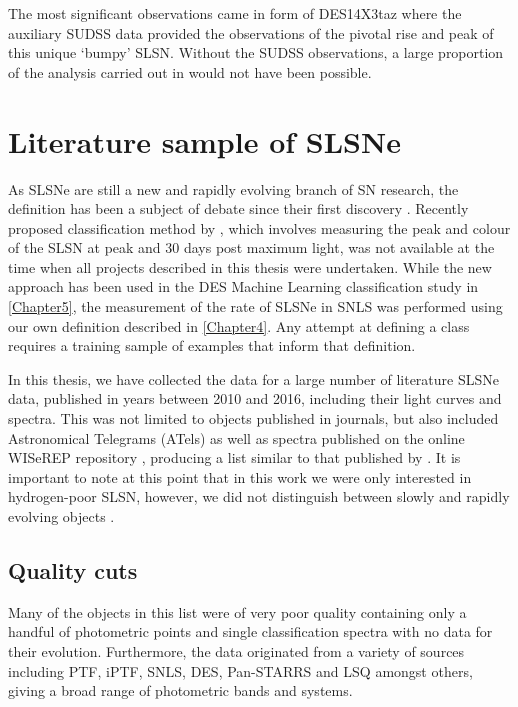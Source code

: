 The most significant observations came in form of DES14X3taz where the auxiliary SUDSS data provided the observations of the pivotal rise and peak of this unique `bumpy' SLSN. Without the SUDSS observations, a large proportion of the analysis carried out in \citep{Smith2016} would not have been possible.

\section{Literature sample of SLSNe} \label{sec:litSample}
As SLSNe are still a new and rapidly evolving branch of SN research, the definition has been a subject of debate since their first discovery \citep{Gal-Yam2012, Inserra2013, Nicholl2014}. Recently proposed classification method by \citet{Inserra2018}, which involves measuring the peak and colour of the SLSN at peak and 30 days post maximum light, was not available at the time when all projects described in this thesis were undertaken. While the new approach has been used in the DES Machine Learning classification study in \cref{Chapter5}, the measurement of the rate of SLSNe in SNLS was performed using our own definition described in \cref{Chapter4}. Any attempt at defining a class requires a training sample of examples that inform that definition.

In this thesis, we have collected the data for a large number of literature SLSNe data, published in years between 2010 and 2016, including their light curves and spectra. This was not limited to objects published in journals, but also included Astronomical Telegrams (ATels) as well as spectra published on the online WISeREP repository \citep{Yaron2012}, producing a list similar to that published by \citet{Schulze2017}. It is important to note at this point that in this work we were only interested in hydrogen-poor SLSN, however, we did not distinguish between slowly and rapidly evolving objects \citep{Gal-Yam2012, Inserra2013}.

\subsection{Quality cuts}
Many of the objects in this list were of very poor quality containing only a handful of photometric points and single classification spectra with no data for their evolution. Furthermore, the data originated from a variety of sources including PTF, iPTF, SNLS, DES, Pan-STARRS and LSQ amongst others, giving a broad range of photometric bands and systems.

